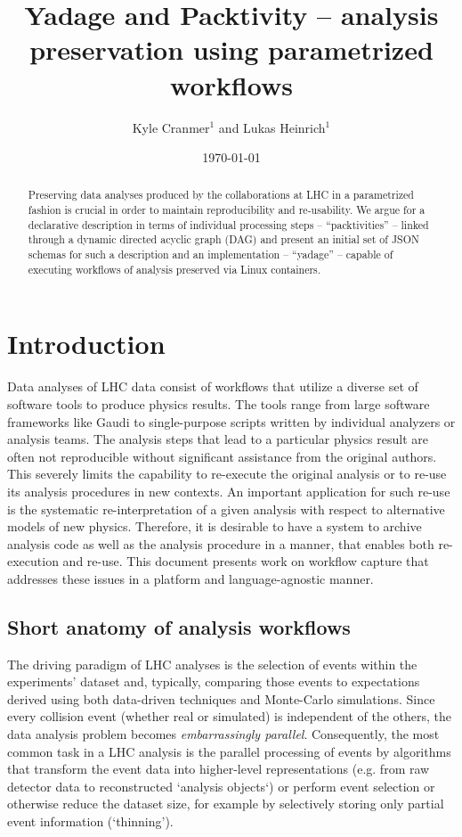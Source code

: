 \documentclass[a4paper]{jpconf}
\date{\today}
\begin{document}
\title{Yadage and Packtivity -- analysis preservation using parametrized workflows}

\author{Kyle Cranmer$^1$ and Lukas Heinrich$^1$}
\address{$^1$ Department of Physics, New York University, New York, USA}


\begin{abstract}
	Preserving data analyses produced by the collaborations at LHC in a parametrized fashion is crucial in order to maintain reproducibility and re-usability. We argue for a declarative description in terms of individual processing steps -- ``packtivities'' -- linked through a dynamic directed acyclic graph (DAG) and present an initial set of JSON schemas for such a description and an implementation -- ``yadage'' --  capable of executing workflows of analysis preserved via Linux containers.
\end{abstract}

\section{Introduction}

Data analyses of LHC data consist of workflows that utilize a diverse set of software tools to produce physics results. The tools range from large software frameworks like Gaudi\cite{Gaudi2001} to single-purpose scripts written by individual analyzers or analysis teams. The analysis steps that lead to a particular physics result are often not reproducible without significant assistance from the original authors. This severely limits the capability to re-execute the original analysis or to re-use its analysis procedures in new contexts. An important application for such re-use is the systematic re-interpretation of a given analysis with respect to alternative models of new physics\cite{Cranmer2011}. Therefore, it is desirable to have a system to archive analysis code as well as the analysis procedure in a manner, that enables both re-execution and re-use. This document presents work on workflow capture that addresses these issues in a platform and language-agnostic manner.

\subsection{Short anatomy of analysis workflows}

The driving paradigm of LHC analyses is the selection of events within the experiments' dataset and, typically, comparing those events to expectations derived using both data-driven techniques and Monte-Carlo simulations. Since every collision event (whether real or simulated) is independent of the others, the data analysis problem becomes \emph{embarrassingly parallel}. Consequently, the most common task in a LHC analysis is the parallel processing of events by algorithms that transform the event data into higher-level representations (e.g. from raw detector data to reconstructed `analysis objects`) or perform event selection or otherwise reduce the dataset size, for example by selectively storing only partial event information (`thinning').
\end{document}
